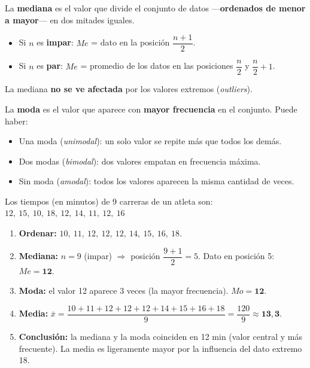 \documentclass[11pt, letterpaper]{article}
\begin{document}
\begin{tcolorbox}[importantbox, title={Mediana $Me$}]
La \textbf{mediana} es el valor que divide el conjunto de datos ---\textbf{ordenados de menor a mayor}--- en dos mitades iguales.

\begin{itemize}
  \item Si $n$ es \textbf{impar}: $Me$ = dato en la posici\'on $\dfrac{n+1}{2}$.
  \item Si $n$ es \textbf{par}: $Me$ = promedio de los datos en las posiciones $\dfrac{n}{2}$ y $\dfrac{n}{2}+1$.
\end{itemize}

La mediana \textbf{no se ve afectada} por los valores extremos (\textit{outliers}).
\end{tcolorbox}

\begin{tcolorbox}[importantbox, title={Moda $Mo$}]
La \textbf{moda} es el valor que aparece con \textbf{mayor frecuencia} en el conjunto. Puede haber:
\begin{itemize}
  \item Una moda (\textit{unimodal}): un solo valor se repite m\'as que todos los dem\'as.
  \item Dos modas (\textit{bimodal}): dos valores empatan en frecuencia m\'axima.
  \item Sin moda (\textit{amodal}): todos los valores aparecen la misma cantidad de veces.
\end{itemize}
\end{tcolorbox}

\begin{tcolorbox}[examplebox, title={Ej. 8. Mediana y moda}]
Los tiempos (en minutos) de 9 carreras de un atleta son:
$12,\ 15,\ 10,\ 18,\ 12,\ 14,\ 11,\ 12,\ 16$

\begin{enumerate}[label=\textbf{Paso \arabic*.}]
  \item \textbf{Ordenar:} $10,\ 11,\ 12,\ 12,\ 12,\ 14,\ 15,\ 16,\ 18$.
  \medskip
  \item \textbf{Mediana:} $n = 9$ (impar) $\Rightarrow$ posici\'on $\dfrac{9+1}{2} = 5$.
  Dato en posici\'on 5: $Me = \mathbf{12}$.

  \medskip
  \item \textbf{Moda:} el valor 12 aparece 3 veces (la mayor frecuencia). $Mo = \mathbf{12}$.
  \medskip
  \item \textbf{Media:} $\bar{x} = \dfrac{10+11+12+12+12+14+15+16+18}{9} = \dfrac{120}{9} \approx \mathbf{13{,}3}$.
  \medskip
  \item \textbf{Conclusi\'on:} la mediana y la moda coinciden en 12 min (valor central y m\'as frecuente). La media es ligeramente mayor por la influencia del dato extremo 18.
\end{enumerate}
\end{tcolorbox}
\end{document}
